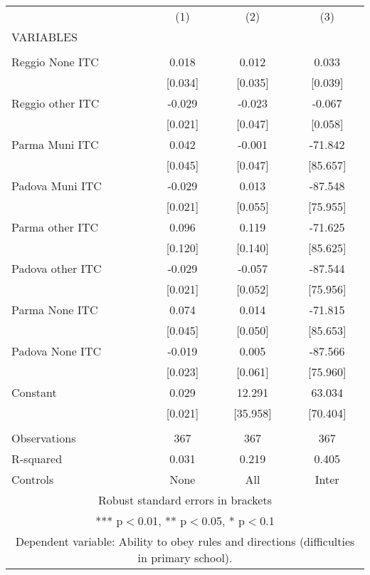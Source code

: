 \begin{tabular}{lccc} \hline
 & (1) & (2) & (3) \\
VARIABLES &  &  &  \\ \hline
 &  &  &  \\
Reggio None ITC & 0.018 & 0.012 & 0.033 \\
 & [0.034] & [0.035] & [0.039] \\
Reggio other ITC & -0.029 & -0.023 & -0.067 \\
 & [0.021] & [0.047] & [0.058] \\
Parma Muni ITC & 0.042 & -0.001 & -71.842 \\
 & [0.045] & [0.047] & [85.657] \\
Padova Muni ITC & -0.029 & 0.013 & -87.548 \\
 & [0.021] & [0.055] & [75.955] \\
Parma other ITC & 0.096 & 0.119 & -71.625 \\
 & [0.120] & [0.140] & [85.625] \\
Padova other ITC & -0.029 & -0.057 & -87.544 \\
 & [0.021] & [0.052] & [75.956] \\
Parma None ITC & 0.074 & 0.014 & -71.815 \\
 & [0.045] & [0.050] & [85.653] \\
Padova None ITC & -0.019 & 0.005 & -87.566 \\
 & [0.023] & [0.061] & [75.960] \\
Constant & 0.029 & 12.291 & 63.034 \\
 & [0.021] & [35.958] & [70.404] \\
 &  &  &  \\
Observations & 367 & 367 & 367 \\
R-squared & 0.031 & 0.219 & 0.405 \\
 Controls & None & All & Inter \\ \hline
\multicolumn{4}{c}{ Robust standard errors in brackets} \\
\multicolumn{4}{c}{ *** p$<$0.01, ** p$<$0.05, * p$<$0.1} \\
\multicolumn{4}{c}{ Dependent variable: Ability to obey rules and directions (difficulties in primary school).} \\
\end{tabular}
